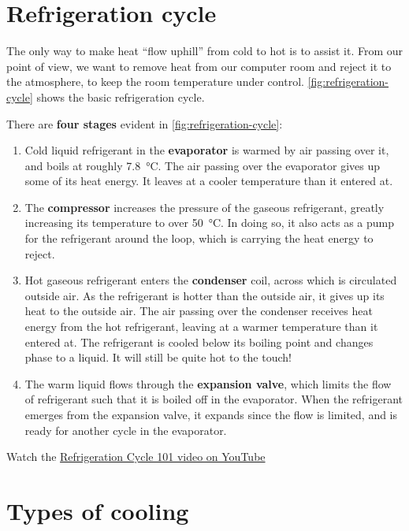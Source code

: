 \documentclass{pgnotes}
\begin{document}
\section{Refrigeration cycle}

The only way to make heat ``flow uphill'' from cold to hot is to assist it.
From our point of view, we want to remove heat from our computer room and reject it to the atmosphere, to keep the room temperature under control.
\autoref{fig:refrigeration-cycle} shows the basic refrigeration cycle.


There are \textbf{four stages} evident in \autoref{fig:refrigeration-cycle}:
\begin{enumerate}
\item Cold liquid refrigerant in the \textbf{evaporator} is warmed by air passing over it, and boils at roughly \SI{7.8}{\degreeCelsius}. The air passing over the evaporator gives up some of its heat energy. It leaves at a cooler temperature than it entered at.
\item The \textbf{compressor} increases the pressure of the gaseous refrigerant, greatly increasing its temperature to over \SI{50}{\degreeCelsius}.  In doing so, it also acts as a pump for the refrigerant around the loop, which is carrying the heat energy to reject.
\item Hot gaseous refrigerant enters the \textbf{condenser} coil, across which is circulated outside air. As the refrigerant is hotter than the outside air, it gives up its heat to the outside air.  The air passing over the condenser receives heat energy from the hot refrigerant, leaving at a warmer temperature than it entered at. The refrigerant is cooled below its boiling point and changes phase to a liquid.  It will still be quite hot to the touch!
\item The warm liquid flows through the \textbf{expansion valve}, which limits the flow of refrigerant such that it is boiled off in the evaporator. When the refrigerant emerges from the expansion valve, it expands since the flow is limited, and is ready for another cycle in the evaporator. 
\end{enumerate}

Watch the \href{https://www.youtube.com/watch?v=VJX0LyxRV0E}{Refrigeration Cycle 101 video on YouTube}

\section{Types of cooling}
\end{document}
